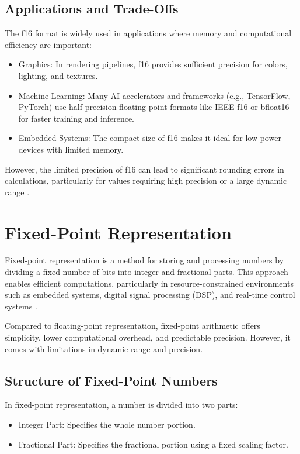 \subsection{Applications and Trade-Offs}
The f16 format is widely used in applications where memory and computational efficiency are important:
\begin{itemize}[noitemsep]
    \item Graphics: In rendering pipelines, f16 provides sufficient precision for colors, lighting, and textures.
    \item Machine Learning: Many AI accelerators and frameworks (e.g., TensorFlow, PyTorch) use half-precision floating-point formats like IEEE f16 or bfloat16 for faster training and inference.
    \item Embedded Systems: The compact size of f16 makes it ideal for low-power devices with limited memory.
\end{itemize}

However, the limited precision of f16 can lead to significant rounding errors in calculations, particularly for values requiring high precision or a large dynamic range \cite{goldberg1991, ieee2008}.


\section{Fixed-Point Representation}
Fixed-point representation is a method for storing and processing numbers by dividing a fixed number of bits into integer and fractional parts. This approach enables efficient computations, particularly in resource-constrained environments such as embedded systems, digital signal processing (DSP), and real-time control systems \cite{lathi2005digital}.

Compared to floating-point representation, fixed-point arithmetic offers simplicity, lower computational overhead, and predictable precision. However, it comes with limitations in dynamic range and precision.

\subsection{Structure of Fixed-Point Numbers}
In fixed-point representation, a number is divided into two parts:
\begin{itemize}[noitemsep]
    \item Integer Part: Specifies the whole number portion.
    \item Fractional Part: Specifies the fractional portion using a fixed scaling factor.
\end{itemize}

